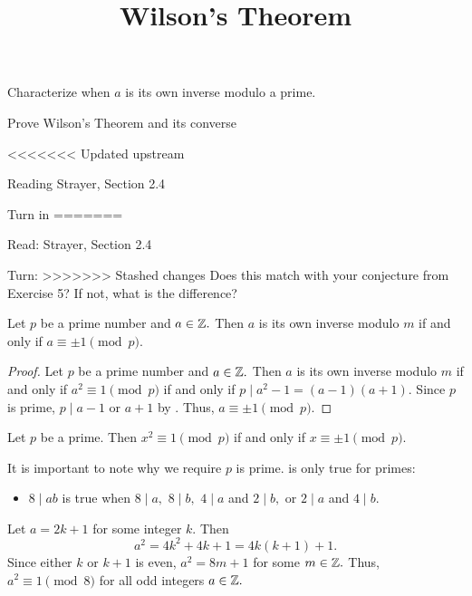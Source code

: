 \documentclass{ximera}
\title{Wilson's Theorem}
\begin{document}
\begin{abstract}
\end{abstract}
\maketitle


\begin{obj}
    \item Characterize when $a$ is its own inverse modulo a prime.

    \item Prove Wilson's Theorem and its converse
\end{obj}

<<<<<<< Updated upstream

\begin{pre}
    \item[Reading] Strayer, Section 2.4

    \item[Turn in]
=======
\begin{pre}
    \item[Read:] Strayer, Section 2.4

    \item[Turn:]
>>>>>>> Stashed changes
    Does this match with your conjecture from Exercise 5? If not, what is the difference?
\end{pre}




\begin{lemma}\label{lem:sqrt1}
    Let $p$ be a prime number and $a\in\mathbb Z.$ Then $a$ is its own inverse modulo $m$ if and only if $a\equiv \pm 1\pmod{p}.$
\end{lemma}

\begin{proof}
    Let $p$ be a prime number and $a\in\mathbb Z.$ Then $a$ is its own inverse modulo $m$ if and only if $a^2\equiv 1 \pmod{p}$ if and only if $p\mid a^2-1=(a-1)(a+1).$ Since $p$ is prime, $p\mid a-1$ or $a+1$ by . Thus, $a\equiv\pm 1\pmod p.$
\end{proof}

\begin{corollary}\label{cor:sqrt1}
    Let $p$ be a prime. Then $x^2\equiv 1\pmod{p}$ if and only if $x\equiv \pm 1\pmod{p}.$
\end{corollary}

\begin{remark}
    It is important to note why we require $p$ is prime.  is only true for primes: 
    \begin{itemize}
        \item $8\mid ab$ is true when $8\mid a,$ $8\mid b,$ $4\mid a$ and $2\mid b,$ or $2\mid a$ and $4\mid b.$
    \end{itemize}
    Let $a=2k+1$ for some integer $k.$ Then 
    \[a^2=4k^2+4k+1=4k(k+1)+1.\]
    Since either $k$ or $k+1$ is even, $a^2=8m+1$ for some $m\in\mathbb Z.$ Thus, $a^2\equiv 1\pmod 8$ for all odd integers $a\in\mathbb Z.$


\end{remark}
\end{pre}
\end{document}
